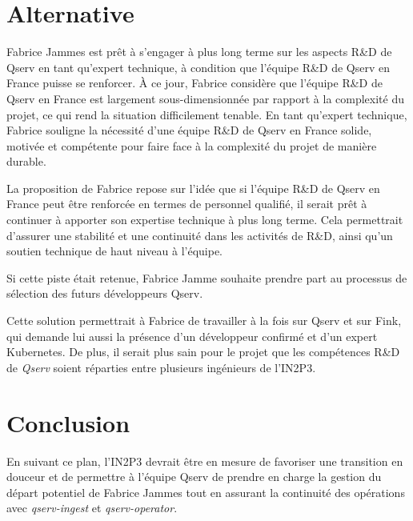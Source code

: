 \documentclass[french] {article}
\begin{document}
\section{Alternative}

Fabrice Jammes est prêt à s'engager à plus long terme sur les aspects R\&D de Qserv en tant qu'expert technique, à condition que l'équipe R\&D de Qserv en France puisse se renforcer. À ce jour, Fabrice considère
que l'équipe R\&D de Qserv en France est largement sous-dimensionnée par rapport à la complexité du projet, ce qui rend la situation difficilement tenable. En tant qu'expert technique,  Fabrice souligne la nécessité
d'une équipe R\&D de Qserv en France solide, motivée et compétente pour faire face à la complexité du projet de manière durable.

La proposition de Fabrice repose sur l'idée que si l'équipe R\&D de Qserv en France peut être renforcée en termes de personnel qualifié, il serait prêt à continuer à apporter son expertise technique
à plus long terme. Cela permettrait d'assurer une stabilité et une continuité dans les activités de R\&D, ainsi qu'un soutien technique de haut niveau à l'équipe.

Si cette piste était retenue, Fabrice Jamme souhaite prendre part au processus de sélection des futurs développeurs Qserv.

Cette solution permettrait à Fabrice de travailler à la fois sur Qserv et sur Fink, qui demande lui aussi la présence d'un développeur confirmé et d'un expert Kubernetes. De plus, il serait plus sain pour le projet que les compétences R\&D de \textit{Qserv} soient réparties entre plusieurs ingénieurs de l'IN2P3.

\section{Conclusion}

En suivant ce plan, l'IN2P3 devrait être en mesure de favoriser une transition en douceur et de permettre à l'équipe Qserv de prendre en charge la gestion du départ potentiel de Fabrice Jammes tout en
assurant la continuité des opérations avec \textit{qserv-ingest} et \textit{qserv-operator}.
\end{document}

